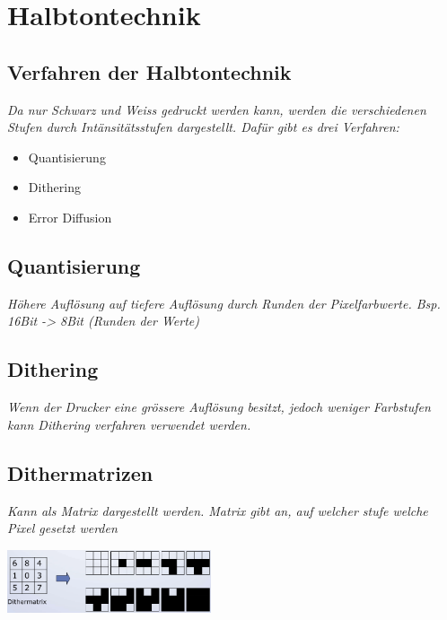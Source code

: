 \section{Halbtontechnik}

\subsection{Verfahren der Halbtontechnik}

\textit{
    Da nur Schwarz und Weiss gedruckt werden kann, werden
    die verschiedenen Stufen durch Intänsitätsstufen
    dargestellt. Dafür gibt es drei Verfahren:
}

\begin{itemize}
    \item Quantisierung
    \item Dithering
    \item Error Diffusion
\end{itemize}

\subsection{Quantisierung}

\textit{
    Höhere Auflösung auf tiefere Auflösung durch Runden
    der Pixelfarbwerte.
    Bsp. 16Bit -> 8Bit (Runden der Werte)
}

\subsection{Dithering}

\textit{
    Wenn der Drucker eine grössere Auflösung besitzt,
    jedoch weniger Farbstufen kann Dithering verfahren
    verwendet werden.
} \\

\subsection{Dithermatrizen}

\textit{
    Kann als Matrix dargestellt werden. Matrix gibt an,
    auf welcher stufe welche Pixel gesetzt werden
}

\includegraphics[width=0.45\textwidth]{assets/dithermatrix.png}

